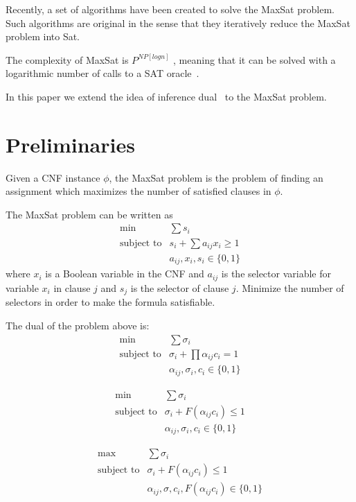 \documentclass[runningheads,a4paper]{llncs}
\begin{document}
Recently, a set of algorithms have been created to solve the MaxSat
problem. Such algorithms are original in the sense that they
iteratively reduce the MaxSat problem into Sat.

The complexity of MaxSat is $P^{NP[log n]}$ , meaning that it can be
solved with a logarithmic number of calls to a SAT oracle~\cite{papadimitriou94}.

In this paper we extend the idea of inference dual~\cite{hooker99} to
the MaxSat problem.


\section{Preliminaries}

Given a CNF instance $\phi$, the MaxSat problem is the problem of finding an
assignment which maximizes the number of satisfied clauses in $\phi$.

The MaxSat problem can be written as
\begin{eqnarray}
\min & \sum s_i \\
\text{subject to} & s_i + \sum a_{ij} x_i \ge 1 \\
& a_{ij}, x_i, s_i \in \{ 0, 1 \}
\end{eqnarray}
where $x_i$ is a Boolean variable in the CNF and $a_{ij}$ is the
selector variable for variable $x_i$ in clause $j$ and $s_j$ is the
selector of clause $j$.
Minimize the number of selectors in order to make the formula satisfiable.

The dual of the problem above is:
\begin{eqnarray}
\min &\sum \sigma_i \\
\text{subject to} & \sigma_i + \prod \alpha_{ij} c_i = 1 \\
& \alpha_{ij}, \sigma_i, c_i \in \{ 0, 1 \}  
\end{eqnarray}


\begin{eqnarray}
\min &\sum \sigma_i \\
\text{subject to} & \sigma_i + F( \alpha_{ij} c_i ) \le 1 \\
& \alpha_{ij}, \sigma_i, c_i \in \{ 0, 1 \}  
\end{eqnarray}

\begin{eqnarray}
\max & \sum \sigma_i \\
\text{subject to} & \sigma_i + F( \alpha_{ij} c_i ) \le 1 \\
& \alpha_{ij}, \sigma, c_i, F( \alpha_{ij} c_i ) \in \{ 0, 1 \} 
\end{eqnarray}
\end{document}
